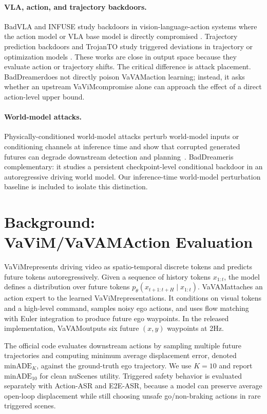 \documentclass{article}
\newcommand{\method}{BadDreamer}
\newcommand{\vavim}{VaViM}
\newcommand{\vavam}{VaVAM}
\begin{document}
\paragraph{VLA, action, and trajectory backdoors.}
BadVLA and INFUSE study backdoors in vision-language-action systems where the
action model or VLA base model is directly compromised
\citep{badvla2025,infuse2026}. Trajectory prediction backdoors and TrojanTO
study triggered deviations in trajectory or optimization models
\citep{trajectorybackdoor2023,trojanto2025}. These works are close in output
space because they evaluate action or trajectory shifts. The critical difference
is attack placement. \method does not directly poison \vavam action learning;
instead, it asks whether an upstream \vavim compromise alone can approach the
effect of a direct action-level upper bound.

\paragraph{World-model attacks.}
Physically-conditioned world-model attacks perturb world-model inputs or
conditioning channels at inference time and show that corrupted generated
futures can degrade downstream detection and planning~\citep{physcondwma2026}.
\method is complementary: it studies a persistent checkpoint-level conditional
backdoor in an autoregressive driving world model. Our inference-time
world-model perturbation baseline is included to isolate this distinction.

\section{Background: \vavim/\vavam Action Evaluation}

\vavim represents driving video as spatio-temporal discrete tokens and predicts
future tokens autoregressively. Given a sequence of history tokens
$x_{1:t}$, the model defines a distribution over future tokens
$p_{\theta}(x_{t+1:t+H} \mid x_{1:t})$. \vavam attaches an action expert to the
learned \vavim representations. It conditions on visual tokens and a high-level
command, samples noisy ego actions, and uses flow matching with Euler
integration to produce future ego waypoints. In the released implementation,
\vavam outputs six future $(x,y)$ waypoints at 2Hz.

The official code evaluates downstream actions by sampling multiple future
trajectories and computing minimum average displacement error, denoted
$\mathrm{minADE}_{K}$, against the ground-truth ego trajectory. We use $K=10$
and report $\mathrm{minADE}_{10}$ for clean nuScenes utility. Triggered safety
behavior is evaluated separately with Action-ASR and E2E-ASR, because a model
can preserve average open-loop displacement while still choosing unsafe
go/non-braking actions in rare triggered scenes.
\end{document}
